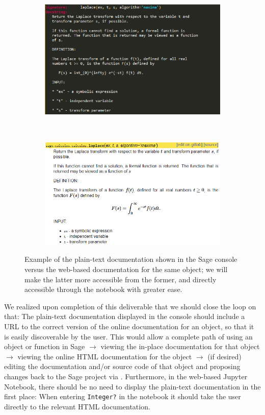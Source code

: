 {\begin{figure}[h!]
    \centering
    \begin{subfigure}[b]{\textwidth}
        \includegraphics[width=\textwidth]{screenshots/docs-console}
    \end{subfigure}
    ~
    \begin{subfigure}[b]{\textwidth}
        \includegraphics[width=\textwidth]{screenshots/docs-web}
    \end{subfigure}
    \caption{Example of the plain-text documentation shown in the Sage console
    versus the web-based documentation for the same object; we will make the
    latter more accessible from the former, and directly accessible through the
    notebook with greater ease.}
    \label{fig:doc-format-comparison}
\end{figure}

We realized upon completion of this deliverable that we should close the loop
on that: The plain-text documentation displayed in the console should include a
URL to the correct version of the online documentation for an object, so that
it is easily discoverable by the user.  This would allow a complete path of
using an object or function in Sage $ \longrightarrow $ viewing the in-place
documentation for that object $ \longrightarrow $ viewing the online HTML
documentation for the object $ \longrightarrow $ (if desired) editing the
documentation and/or source code of that object and proposing changes back to
the Sage project via \GitLab.  Furthermore, in the web-based Jupyter Notebook,
there should be no need to display the plain-text documentation in the first
place: When entering {\tt Integer?} in the notebook it should take the user
directly to the relevant HTML documentation.

}
